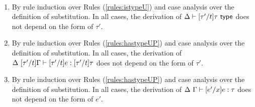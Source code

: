 \begin{proof-sketch} ~
\begin{enumerate}
\item By rule induction over Rules (\ref{rules:istypeU}) and case analysis over the definition of substitution. In all cases, the derivation of $\Delta \vdash [\tau'/t]\tau~\mathsf{type}$ does not depend on the form of $\tau'$.
\item By  rule induction over Rules (\ref{rules:hastypeUP})  and case analysis over the definition of substitution. In all cases, the derivation of $\Delta~[\tau'/t]\Gamma \vdash [\tau'/t]e : [\tau'/t]\tau$  does not depend on the form of $\tau'$.
\item By  rule induction over Rules (\ref{rules:hastypeUP})  and case analysis over the definition of substitution. In all cases, the derivation of $\Delta~\Gamma \vdash [e'/x]e : \tau$  does not depend on the form of $e'$.
\end{enumerate}
\end{proof-sketch}

